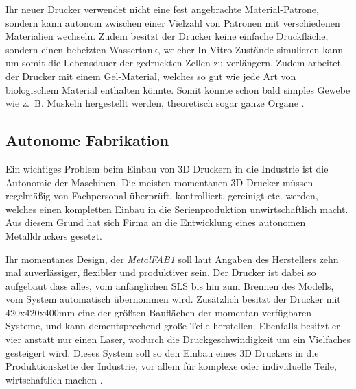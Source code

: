Ihr neuer Drucker verwendet nicht eine fest angebrachte Material-Patrone, sondern kann autonom zwischen einer Vielzahl von Patronen mit verschiedenen Materialien wechseln. Zudem besitzt der Drucker keine einfache Druckfläche, sondern einen beheizten Wassertank, welcher In-Vitro Zustände simulieren kann um somit die Lebensdauer der gedruckten Zellen zu verlängern. Zudem arbeitet der Drucker mit einem Gel-Material, welches so gut wie jede Art von biologischem Material enthalten könnte. Somit könnte schon bald simples Gewebe wie z.~B. Muskeln hergestellt werden, theoretisch sogar ganze Organe \parencite{10_BIOPRINT}.

\subsection{Autonome Fabrikation}
Ein wichtiges Problem beim Einbau von 3D Druckern in die Industrie ist die Autonomie der Maschinen. Die meisten momentanen 3D Drucker müssen regelmäßig von Fachpersonal überprüft, kontrolliert, gereinigt etc. werden, welches einen kompletten Einbau in die Serienproduktion unwirtschaftlich macht. Aus diesem Grund hat sich Firma  an die Entwicklung eines autonomen Metalldruckers gesetzt. 

Ihr momentanes Design, der \emph{MetalFAB1} soll laut Angaben des Herstellers zehn mal zuverlässiger, flexibler und produktiver sein. Der Drucker ist dabei so aufgebaut dass alles, vom anfänglichen SLS bis hin zum Brennen des Modells, vom System automatisch übernommen wird. Zusätzlich besitzt der Drucker mit 420x420x400mm eine der größten Bauflächen der momentan verfügbaren Systeme, und kann dementsprechend große Teile herstellen. Ebenfalls besitzt er vier anstatt nur einen Laser, wodurch die Druckgeschwindigkeit um ein Vielfaches gesteigert wird.
Dieses System soll so den Einbau eines 3D Druckers in die Produktionskette der Industrie, vor allem für komplexe oder individuelle Teile, wirtschaftlich machen \parencite{MetalFAB}.